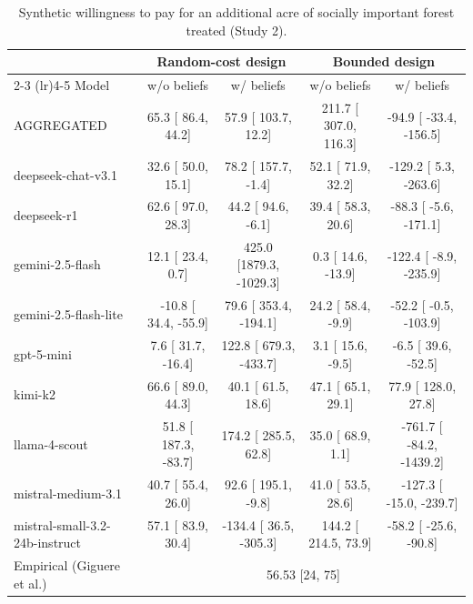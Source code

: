 \begin{table}[h]
\centering
\caption{Synthetic willingness to pay for an additional acre of socially important forest treated (Study 2).}
\label{tab:syn-wtp-Study2}
\begin{threeparttable}
\footnotesize
\begin{tabular}{lcccc}
\toprule
 & \multicolumn{2}{c}{Random-cost design} & \multicolumn{2}{c}{Bounded design} \\
\cmidrule(lr){2-3} \cmidrule(lr){4-5}
Model & w/o beliefs & w/ beliefs & w/o beliefs & w/ beliefs \\
\midrule
AGGREGATED &   65.3 [  86.4,   44.2] &   57.9 [ 103.7,   12.2] &  211.7 [ 307.0,  116.3] &  -94.9 [ -33.4, -156.5] \\
\midrule
deepseek-chat-v3.1 &   32.6 [  50.0,   15.1] &   78.2 [ 157.7,   -1.4] &   52.1 [  71.9,   32.2] & -129.2 [   5.3, -263.6] \\
deepseek-r1 &   62.6 [  97.0,   28.3] &   44.2 [  94.6,   -6.1] &   39.4 [  58.3,   20.6] &  -88.3 [  -5.6, -171.1] \\
gemini-2.5-flash &   12.1 [  23.4,    0.7] &  425.0 [1879.3, -1029.3] &    0.3 [  14.6,  -13.9] & -122.4 [  -8.9, -235.9] \\
gemini-2.5-flash-lite &  -10.8 [  34.4,  -55.9] &   79.6 [ 353.4, -194.1] &   24.2 [  58.4,   -9.9] &  -52.2 [  -0.5, -103.9] \\
gpt-5-mini &    7.6 [  31.7,  -16.4] &  122.8 [ 679.3, -433.7] &    3.1 [  15.6,   -9.5] &   -6.5 [  39.6,  -52.5] \\
kimi-k2 &   66.6 [  89.0,   44.3] &   40.1 [  61.5,   18.6] &   47.1 [  65.1,   29.1] &   77.9 [ 128.0,   27.8] \\
llama-4-scout &   51.8 [ 187.3,  -83.7] &  174.2 [ 285.5,   62.8] &   35.0 [  68.9,    1.1] & -761.7 [ -84.2, -1439.2] \\
mistral-medium-3.1 &   40.7 [  55.4,   26.0] &   92.6 [ 195.1,   -9.8] &   41.0 [  53.5,   28.6] & -127.3 [ -15.0, -239.7] \\
mistral-small-3.2-24b-instruct &   57.1 [  83.9,   30.4] & -134.4 [  36.5, -305.3] &  144.2 [ 214.5,   73.9] &  -58.2 [ -25.6,  -90.8] \\
\midrule
Empirical (Giguere et al.) & \multicolumn{4}{c}{56.53 [24, 75]} \\
\bottomrule
\end{tabular}
\end{threeparttable}
\end{table}
